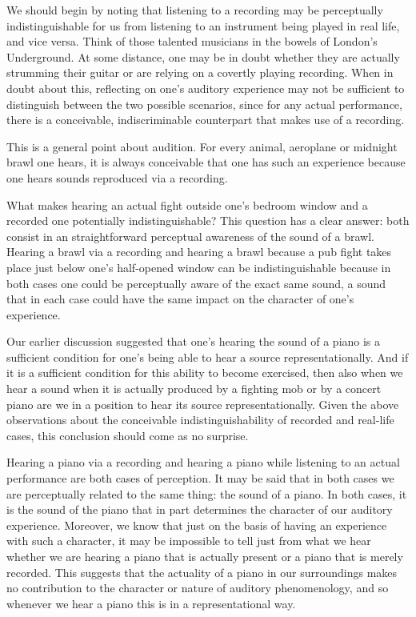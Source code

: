 \documentclass[sloppy, journal, git, bytitle, dodraft]{humapap}
\begin{document}
We should begin by noting that listening to a recording may be
perceptually indistinguishable for us from listening to an instrument
being played in real life, and vice versa. Think of those talented
musicians in the bowels of London's Underground. At some distance, one
may be in doubt whether they are actually strumming their guitar or are
relying on a covertly playing recording. When in doubt about this,
reflecting on one's auditory experience may not be sufficient to
distinguish between the two possible scenarios, since for any actual
performance, there is a conceivable, indiscriminable counterpart that
makes use of a recording.

This is a general point about audition. For every animal, aeroplane or
midnight brawl one hears, it is always conceivable that one has such an
experience because one hears sounds reproduced via a recording.

What makes hearing an actual fight outside one's bedroom window and a
recorded one potentially indistinguishable? This question has a clear
answer: both consist in an straightforward perceptual awareness of the
sound of a brawl. Hearing a brawl via a recording and hearing a brawl
because a pub fight takes place just below one's half-opened window can
be indistinguishable because in both cases one could be perceptually
aware of the exact same sound, a sound that in each case could have the
same impact on the character of one's experience.

Our earlier discussion suggested that one's hearing the sound of a piano
is a sufficient condition for one's being able to hear a source
representationally. And if it is a sufficient condition for this ability
to become exercised, then also when we hear a sound when it is actually
produced by a fighting mob or by a concert piano are we in a position to
hear its source representationally. Given the above observations about
the conceivable indistinguishability of recorded and real-life cases,
this conclusion should come as no surprise.

Hearing a piano via a recording and hearing a piano while listening to
an actual performance are both cases of perception. It may be said that
in both cases we are perceptually related to the same thing: the sound
of a piano. In both cases, it is the sound of the piano that in part
determines the character of our auditory experience. Moreover, we know
that just on the basis of having an experience with such a character, it
may be impossible to tell just from what we hear whether we are hearing
a piano that is actually present or a piano that is merely recorded.
This suggests that the actuality of a piano in our surroundings makes no
contribution to the character or nature of auditory phenomenology, and
so whenever we hear a piano this is in a representational way.
\end{document}
